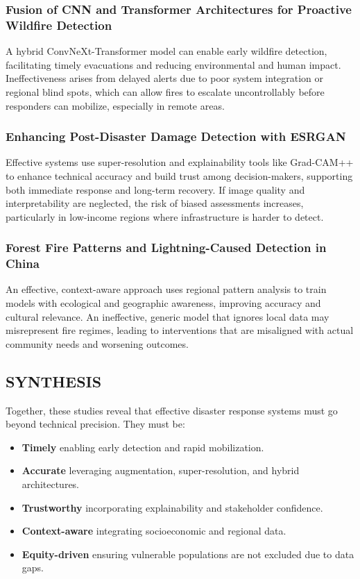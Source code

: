 \documentclass[conference,a4paper]{IEEEtran}
\begin{document}
\subsubsection{Fusion of CNN and Transformer Architectures for Proactive Wildfire Detection}
A hybrid ConvNeXt-Transformer model can enable early wildfire detection, facilitating timely evacuations and reducing environmental and human impact. Ineffectiveness arises from delayed alerts due to poor system integration or regional blind spots, which can allow fires to escalate uncontrollably before responders can mobilize, especially in remote areas.

\subsubsection{Enhancing Post-Disaster Damage Detection with ESRGAN}
Effective systems use super-resolution and explainability tools like Grad-CAM++ to enhance technical accuracy and build trust among decision-makers, supporting both immediate response and long-term recovery. If image quality and interpretability are neglected, the risk of biased assessments increases, particularly in low-income regions where infrastructure is harder to detect.

\subsubsection{Forest Fire Patterns and Lightning-Caused Detection in China}
An effective, context-aware approach uses regional pattern analysis to train models with ecological and geographic awareness, improving accuracy and cultural relevance. An ineffective, generic model that ignores local data may misrepresent fire regimes, leading to interventions that are misaligned with actual community needs and worsening outcomes.

\subsection{SYNTHESIS}

Together, these studies reveal that effective disaster response systems must go beyond technical precision. They must be:

\begin{itemize}
    \item \textbf{Timely} enabling early detection and rapid mobilization.
    \item \textbf{Accurate} leveraging augmentation, super-resolution, and hybrid architectures.
    \item \textbf{Trustworthy} incorporating explainability and stakeholder confidence.
    \item \textbf{Context-aware} integrating socioeconomic and regional data.
    \item \textbf{Equity-driven} ensuring vulnerable populations are not excluded due to data gaps.
\end{itemize}
\end{document}
